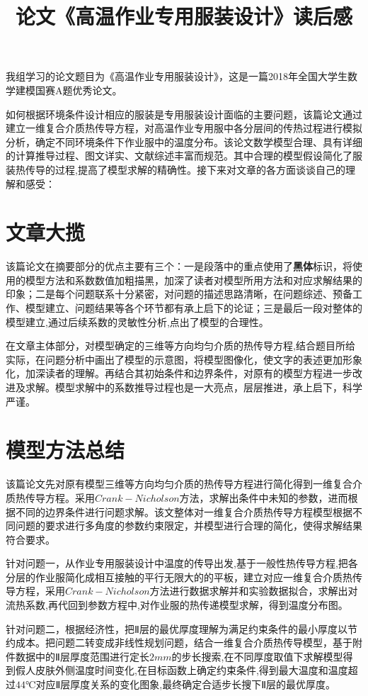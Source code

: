 \documentclass{whutmod}
\title{论文《高温作业专用服装设计》读后感}
\begin{document}
	
\Large   
我组学习的论文题目为《高温作业专用服装设计》，这是一篇2018年全国大学生数学建模国赛A题优秀论文。

如何根据环境条件设计相应的服装是专用服装设计面临的主要问题，该篇论文通过建立一维复合介质热传导方程，对高温作业专用服中各分层间的传热过程进行模拟分析，确定不同环境条件下作业服中的温度分布。该论文数学模型合理、具有详细的计算推导过程、图文详实、文献综述丰富而规范。其中合理的模型假设简化了服装热传导的过程,提高了模型求解的精确性。接下来对文章的各方面谈谈自己的理解和感受：

\section{文章大揽}
该篇论文在摘要部分的优点主要有三个：一是段落中的重点使用了\textbf{黑体}标识，将使用的模型方法和系数数值加粗描黑，加深了读者对模型所用方法和对应求解结果的印象；二是每个问题联系十分紧密，对问题的描述思路清晰，在问题综述、预备工作、模型建立、问题结果等各个环节都有承上启下的论证；三是最后一段对整体的模型建立,通过后续系数的灵敏性分析,点出了模型的合理性。

在文章主体部分，对模型确定的三维等方向均匀介质的热传导方程,结合题目所给实际，在问题分析中画出了模型的示意图，将模型图像化，使文字的表述更加形象化，加深读者的理解。再结合其初始条件和边界条件，对原有的模型方程进一步改进及求解。模型求解中的系数推导过程也是一大亮点，层层推进，承上启下，科学严谨。


\section{模型方法总结}
该篇论文先对原有模型三维等方向均匀介质的热传导方程进行简化得到一维复合介质热传导方程。采用$Crank-Nicholson$方法，求解出条件中未知的参数，进而根据不同的边界条件进行问题求解。该文整体对一维复合介质热传导方程模型根据不同问题的要求进行多角度的参数约束限定，并模型进行合理的简化，使得求解结果符合要求。

针对问题一，从作业专用服装设计中温度的传导出发,基于一般性热传导方程,把各分层的作业服简化成相互接触的平行无限大的的平板，建立对应一维复合介质热传导方程，采用$Crank-Nicholson$方法进行数据求解并和实验数据拟合，求解出对流热系数,再代回到参数方程中,对作业服的热传递模型求解，得到温度分布图。

针对问题二，根据经济性，把Ⅱ层的最优厚度理解为满足约束条件的最小厚度以节约成本。把问题二转变成非线性规划问题，结合一维复合介质热传导模型，基于附件数据中的Ⅱ层厚度范围进行定长$2mm$的步长搜索,在不同厚度取值下求解模型得到假人皮肤外侧温度时间变化,在目标函数上确定约束条件,得到最大温度和温度超过$44℃$对应Ⅱ层厚度关系的变化图象,最终确定合适步长搜下Ⅱ层的最优厚度。
\end{document}
